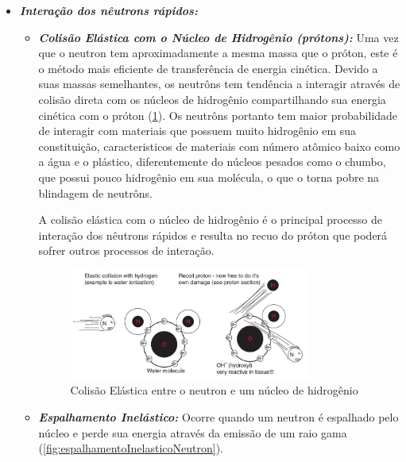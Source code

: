 \documentclass[11pt,a4paper]{article}
\begin{document}
            \begin{itemize}
                \item \textbf{\textit{\textcolor{CarnationPink}{Interação dos nêutrons rápidos}:}} 
                
                    \begin{itemize}
                        \item \textbf{\textit{\textcolor{CarnationPink}{Colisão Elástica com o Núcleo de Hidrogênio (prótons)}:}} Uma vez que o neutron tem aproximadamente a mesma massa que o próton, este é o método mais eficiente de transferência de energia cinética. Devido a suas massas semelhantes, os neutrôns tem tendência a interagir através de colisão direta com os núcleos de hidrogênio compartilhando sua energia cinética com o próton (\ref{fig:colisaoElasticaNeutronProton}). Os neutrôns portanto tem maior probabilidade de interagir com materiais que possuem muito hidrogênio em sua constituição, caracteristicos de materiais com número atômico baixo como a água e o plástico, diferentemente do núcleos pesados como o chumbo, que possui pouco hidrogênio em sua molécula, o que o torna pobre na blindagem de neutrôns. 
                        
                        A colisão elástica com o núcleo de hidrogênio é o principal processo de interação dos nêutrons rápidos e resulta no recuo do próton que poderá sofrer outros processos de interação. 

                            \begin{figure}[h]
                                \centering
                                \includegraphics[width=0.8\textwidth]{Imagens/colisaoElasticaNeutronProton.JPG}
                                \caption{Colisão Elástica entre o neutron e um núcleo de hidrogênio}
                                \label{fig:colisaoElasticaNeutronProton}                
                            \end{figure}

                        \item \textbf{\textit{\textcolor{CarnationPink}{Espalhamento Inelástico}:}} Ocorre quando um neutron é espalhado pelo núcleo e perde sua energia através da emissão de um raio gama (\ref{fig:espalhamentoInelasticoNeutron}). 
                        

\end{itemize}
\end{itemize}
\end{document}
